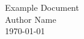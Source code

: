 \begin{titlepage}
    \centering
    \vspace*{\fill}
    {\LARGE Example Document\\[1.5em]}
    {\large Author Name\\[1.5em]}
    {\large \today\\}
    \vspace*{\fill}
\end{titlepage}
